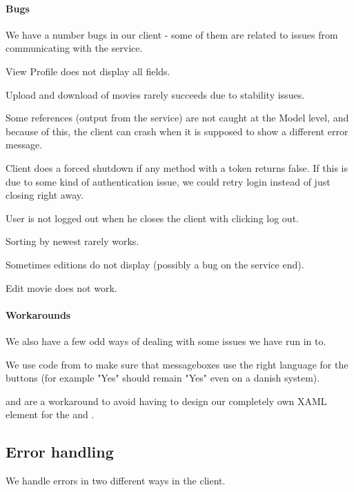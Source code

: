 \paragraph{Bugs} We have a number bugs in our client - some of them are related to issues from communicating with the service.
\begin{my_itemize}
\item View Profile does not display all fields.
\item Upload and download of movies rarely succeeds due to stability issues.
\item Some  references (output from the service) are not caught at the Model level, and because of this, the client can crash when it is supposed to show a different error message.
\item Client does a forced shutdown if any method with a token returns false. If this is due to some kind of authentication issue, we could retry login instead of just closing right away.
\item User is not logged out when he closes the client with clicking log out.
\item Sorting by newest rarely works.
\item Sometimes editions do not display (possibly a bug on the service end).
\item Edit movie does not work.
\end{my_itemize}

\paragraph{Workarounds} We also have a few odd ways of dealing with some issues we have run in to.
\begin{my_itemize}
\item We use code from \cite{CODE:MSGBOX} to make sure that messageboxes use the right language for the buttons (for example "Yes" should remain "Yes" even on a danish system).
\item {} and  are a workaround to avoid having to design our completely own XAML element for the  and .
\end{my_itemize}

\subsection{Error handling}
\label{Implementation_Client_Error}
We handle errors in two different ways in the client.

